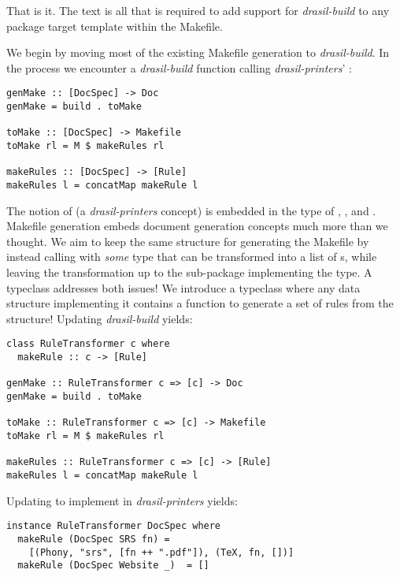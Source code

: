 {{{{{That is it. The text  is all that is required to add support for \textit{drasil-build} to any package target template within the Makefile.

We begin by moving most of the existing Makefile generation to \textit{drasil-build}. In the process we encounter a \textit{drasil-build} function calling \textit{drasil-printers}' :

\begin{tcolorbox}
\begin{verbatim}
genMake :: [DocSpec] -> Doc
genMake = build . toMake

toMake :: [DocSpec] -> Makefile
toMake rl = M $ makeRules rl

makeRules :: [DocSpec] -> [Rule]
makeRules l = concatMap makeRule l
\end{verbatim}
\end{tcolorbox}

The notion of  (a \textit{drasil-printers} concept) is embedded in the type of , , and . Makefile generation embeds document generation concepts much more than we thought. We aim to keep the same structure for generating the Makefile by instead calling  with \textit{some} type that can be transformed into a list of s, while leaving the transformation up to the sub-package implementing the type. A typeclass addresses both issues! We introduce a  typeclass where any data structure implementing it contains a function  to generate a set of rules from the structure! Updating \textit{drasil-build} yields:

\begin{tcolorbox}
\begin{verbatim}
class RuleTransformer c where
  makeRule :: c -> [Rule]

genMake :: RuleTransformer c => [c] -> Doc
genMake = build . toMake

toMake :: RuleTransformer c => [c] -> Makefile
toMake rl = M $ makeRules rl

makeRules :: RuleTransformer c => [c] -> [Rule]
makeRules l = concatMap makeRule l
\end{verbatim}
\end{tcolorbox}

Updating  to implement  in \textit{drasil-printers} yields:

\begin{tcolorbox}
\begin{verbatim}
instance RuleTransformer DocSpec where
  makeRule (DocSpec SRS fn) = 
    [(Phony, "srs", [fn ++ ".pdf"]), (TeX, fn, [])]
  makeRule (DocSpec Website _)  = []
\end{verbatim}
\end{tcolorbox}

}}}}}
